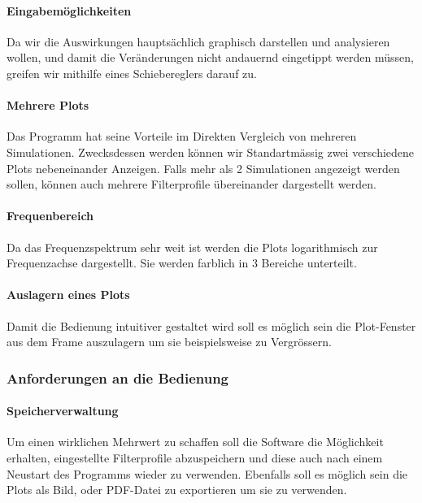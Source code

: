 \paragraph{Eingabemöglichkeiten}\label{para:eingabemöglichkeiten}
		Da wir  die Auswirkungen hauptsächlich graphisch darstellen und analysieren wollen, und damit die Veränderungen nicht andauernd eingetippt werden müssen, greifen wir mithilfe eines Schiebereglers darauf zu.
\bigskip
\paragraph{Mehrere Plots}\label{para:mehrereplots}
		Das Programm hat seine Vorteile im Direkten Vergleich von mehreren Simulationen. Zwecksdessen werden können wir Standartmässig zwei verschiedene Plots nebeneinander Anzeigen. Falls mehr als 2 Simulationen angezeigt 		werden sollen, können auch mehrere Filterprofile übereinander dargestellt werden. 
\bigskip
\paragraph{Frequenbereich}\label{para:frequenzbereich}
		Da das Frequenzspektrum sehr weit ist werden die Plots logarithmisch zur Frequenzachse dargestellt. Sie werden farblich in 3 Bereiche unterteilt.
\bigskip
\paragraph{Auslagern eines Plots}\label{para:auslagerneinesplots}
Damit die Bedienung intuitiver gestaltet wird soll es möglich sein die Plot-Fenster aus dem Frame auszulagern um sie beispielsweise zu Vergrössern. 
		

\subsubsection{Anforderungen an die Bedienung} \label{subsubsec:bedienungsanforderungen}

\bigskip
{}
\paragraph{Speicherverwaltung}  \label{para:speicherverwaltung}
Um einen wirklichen Mehrwert zu schaffen soll die Software die Möglichkeit erhalten, eingestellte Filterprofile abzuspeichern und diese auch nach einem Neustart des Programms wieder zu verwenden. 
		Ebenfalls soll es möglich sein die Plots als Bild, oder PDF-Datei zu exportieren um sie zu verwenden.
\bigskip

